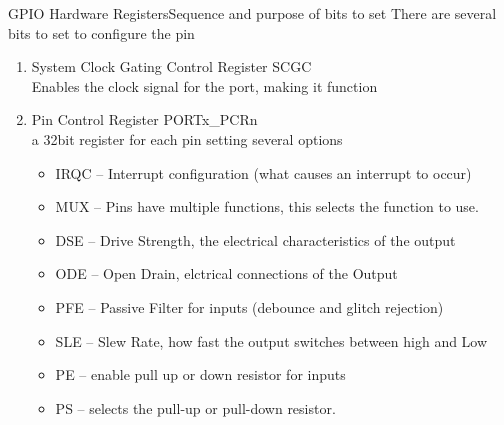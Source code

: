\documentclass[xcolor=svgnames]{beamer}
\begin{document}
\begin{frame}{GPIO Hardware Registers}{Sequence and purpose of bits to set}
There are several bits to set to configure the pin
\begin{enumerate}
  \item System Clock Gating Control Register  \alert{SCGC} \\
    Enables the clock signal for the port, making it function
  \item Pin Control Register \alert{PORTx\_PCRn}\\
    a 32bit register for each pin setting several options
    \begin{itemize}
      \item IRQC -- Interrupt configuration (what causes an interrupt to occur)
      \item MUX -- Pins have multiple functions, this selects the function to use.
      \item DSE -- Drive Strength, the electrical characteristics of the output
      \item ODE -- Open Drain, elctrical connections of the Output
      \item PFE -- Passive Filter for inputs (debounce and glitch rejection)
      \item SLE -- Slew Rate, how fast the output switches between high and Low
      \item PE -- enable pull up or down resistor for inputs
      \item PS -- selects the pull-up or pull-down resistor.
    \end{itemize}
\end{enumerate}
\end{frame}
\end{document}
